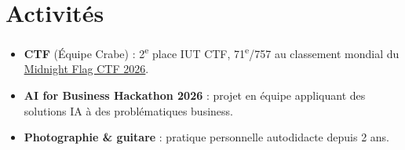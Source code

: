 \documentclass[a4paper,10pt]{article}
\newcommand{\resumeItem}[1]{
  \item\small{#1 \vspace{0pt}}
}
\begin{document}
\section{Activités}
\begin{itemize}[nosep,leftmargin=0.15in,label=\textbullet]
    \resumeItem{\textbf{CTF} (Équipe Crabe) : 2\textsuperscript{e} place IUT CTF, 71\textsuperscript{e}/757 au classement mondial du \href{https://ctftime.org/event/3105}{\underline{Midnight Flag CTF 2026}}.}
    \resumeItem{\textbf{AI for Business Hackathon 2026} : projet en équipe appliquant des solutions IA à des problématiques business.}
    \resumeItem{\textbf{Photographie \& guitare} : pratique personnelle autodidacte depuis 2 ans.}
\end{itemize}
\end{document}
